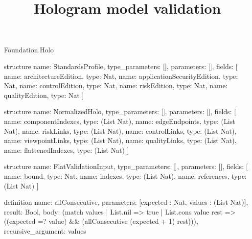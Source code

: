 \begin{lexlean}{Foundation.Holo}
\title{Hologram model validation}
\begin{semanticmodule}
structure{
  name: StandardsProfile,
  type_parameters: [],
  parameters: [],
  fields: [
    {name: architectureEdition, type: Nat},
    {name: applicationSecurityEdition, type: Nat},
    {name: controlEdition, type: Nat},
    {name: riskEdition, type: Nat},
    {name: qualityEdition, type: Nat}
  ]
}

structure{
  name: NormalizedHolo,
  type_parameters: [],
  parameters: [],
  fields: [
    {name: componentIndexes, type: (List Nat)},
    {name: edgeEndpoints, type: (List Nat)},
    {name: riskLinks, type: (List Nat)},
    {name: controlLinks, type: (List Nat)},
    {name: viewpointLinks, type: (List Nat)},
    {name: qualityLinks, type: (List Nat)},
    {name: flattenedIndexes, type: (List Nat)}
  ]
}

structure{
  name: FlatValidationInput,
  type_parameters: [],
  parameters: [],
  fields: [
    {name: bound, type: Nat},
    {name: indexes, type: (List Nat)},
    {name: references, type: (List Nat)}
  ]
}

definition{
  name: allConsecutive,
  parameters: [expected : Nat, values : (List Nat)],
  result: Bool,
  body: (match values
    | List.nil => true
    | List.cons value rest => ((expected =? value) && (allConsecutive (expected + 1) rest))),
  recursive_argument: values
}


\end{semanticmodule}
\end{lexlean}
